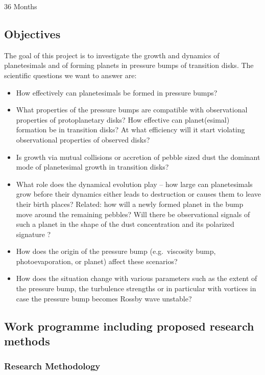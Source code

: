 \documentclass[10pt,fleqn,twoside]{article}
\begin{document}
36 Months

\subsection{Objectives}

The goal of this project is to investigate the growth and dynamics of
planetesimals and of forming planets in pressure bumps of transition
disks. The scientific questions we want to answer are:

\begin{itemize}
  \item How effectively can planetesimals be formed in pressure bumps?
  \item What properties of the pressure bumps are compatible with
  observational properties of protoplanetary disks?
  How effective can planet(esimal) formation be in transition disks?
  At what efficiency will it start violating observational properties
  of observed disks?
  \item Is growth via mutual collisions or accretion of pebble sized
  dust the dominant mode of planetesimal growth in transition disks?
  \item What role does the dynamical evolution play -- how large can
  planetesimals grow before their dynamics either leads to destruction
  or causes them to leave their birth places? Related: how will a
  newly formed planet in the bump move around the remaining pebbles?
  Will there be observational signals of such a planet in the shape of
  the dust concentration and its polarized signature \citep[such as
  the offset between the sub-mm continuum and polarized intensity,
  see][]{2016ApJ...831L..12K}?
  \item How does the origin of the pressure bump (e.g.\ viscosity
  bump, photoevaporation, or planet) affect these scenarios?
  \item How does the situation change with various parameters such as
  the extent of the pressure bump, the turbulence strengths or
  in particular with vortices in case the pressure bump becomes
  Rossby wave unstable?
\end{itemize}

\subsection{Work programme including proposed research methods}

\subsubsection{Research Methodology}
\end{document}
